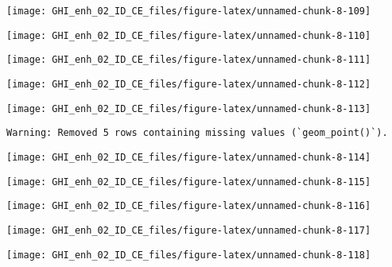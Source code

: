 \documentclass[
  10pt,
  a4paper,oneside]{article}
\begin{document}
\begin{center}\texttt{[image: GHI\_enh\_02\_ID\_CE\_files/figure-latex/unnamed-chunk-8-109]} \end{center}

\begin{center}\texttt{[image: GHI\_enh\_02\_ID\_CE\_files/figure-latex/unnamed-chunk-8-110]} \end{center}

\begin{center}\texttt{[image: GHI\_enh\_02\_ID\_CE\_files/figure-latex/unnamed-chunk-8-111]} \end{center}

\begin{center}\texttt{[image: GHI\_enh\_02\_ID\_CE\_files/figure-latex/unnamed-chunk-8-112]} \end{center}

\begin{center}\texttt{[image: GHI\_enh\_02\_ID\_CE\_files/figure-latex/unnamed-chunk-8-113]} \end{center}

\begin{verbatim}
Warning: Removed 5 rows containing missing values (`geom_point()`).
\end{verbatim}

\begin{center}\texttt{[image: GHI\_enh\_02\_ID\_CE\_files/figure-latex/unnamed-chunk-8-114]} \end{center}

\begin{center}\texttt{[image: GHI\_enh\_02\_ID\_CE\_files/figure-latex/unnamed-chunk-8-115]} \end{center}

\begin{center}\texttt{[image: GHI\_enh\_02\_ID\_CE\_files/figure-latex/unnamed-chunk-8-116]} \end{center}

\begin{center}\texttt{[image: GHI\_enh\_02\_ID\_CE\_files/figure-latex/unnamed-chunk-8-117]} \end{center}

\begin{center}\texttt{[image: GHI\_enh\_02\_ID\_CE\_files/figure-latex/unnamed-chunk-8-118]} \end{center}
\end{document}
